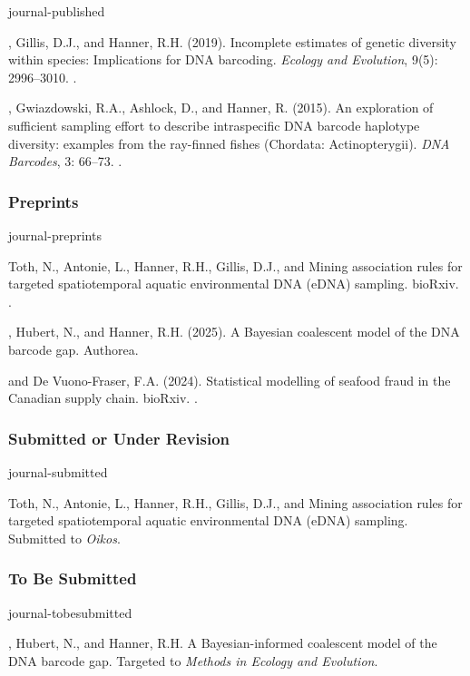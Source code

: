 \begin{revlist}[itemsep=0.45\baselineskip]{journal-published}
\item \me, Gillis, D.J., and Hanner, R.H. (2019). Incomplete estimates of genetic
  diversity within species: Implications for DNA barcoding. \textit{Ecology and
  Evolution}, 9(5): 2996--3010.
  .
\item \me, Gwiazdowski, R.A., Ashlock, D., and Hanner, R. (2015). An exploration
  of sufficient sampling effort to describe intraspecific DNA barcode haplotype
  diversity: examples from the ray-finned fishes (Chordata: Actinopterygii).
  \textit{DNA Barcodes}, 3: 66--73.
  .
\end{revlist}

\subsubsection{Preprints}
\begin{revlist}[itemsep=0.45\baselineskip]{journal-preprints}
\item \dsup Toth, N., Antonie, L., Hanner, R.H., Gillis, D.J., and \me Mining
  association rules for targeted spatiotemporal aquatic environmental DNA (eDNA)
  sampling. bioRxiv.
  .
\item \me, Hubert, N., and Hanner, R.H. (2025). A Bayesian coalescent model of the
  DNA barcode gap. Authorea. 
\item \me and \dsup De Vuono-Fraser, F.A. (2024). Statistical modelling of
  seafood fraud in the Canadian supply chain. bioRxiv. .
\end{revlist}

\subsubsection{Submitted or Under Revision}
\begin{revlist}{journal-submitted}
\item \dsup Toth, N., Antonie, L., Hanner, R.H., Gillis, D.J., and \me Mining
  association rules for targeted spatiotemporal aquatic environmental DNA (eDNA)
  sampling. Submitted to \textit{Oikos}.
\end{revlist}

\subsubsection{To Be Submitted}
\begin{revlist}{journal-tobesubmitted}
\item \me, Hubert, N., and Hanner, R.H. A Bayesian-informed coalescent model of the
  DNA barcode gap. Targeted to \textit{Methods in Ecology and Evolution}.
\end{revlist}

